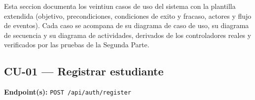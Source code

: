 
Esta seccion documenta los veintiun casos de uso del sistema con la plantilla extendida (objetivo, precondiciones, condiciones de exito y fracaso, actores y flujo de eventos). Cada caso se acompana de su diagrama de caso de uso, su diagrama de secuencia y su diagrama de actividades, derivados de los controladores reales y verificados por las pruebas de la Segunda Parte.


\subsection{CU-01 --- Registrar estudiante}

\noindent\textbf{Endpoint(s):} \texttt{POST /api/auth/register}\par\vspace{4pt}

